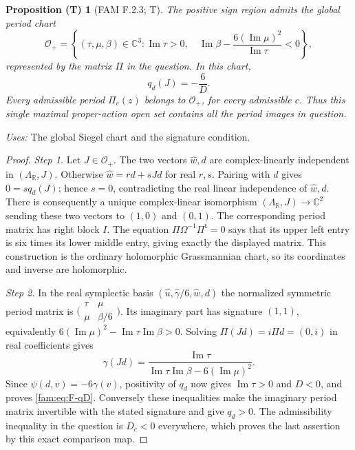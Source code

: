 \documentclass[11pt,a4paper]{article}
\theoremstyle{plain}
\newtheorem{proposition}[theorem]{Proposition (T)}
\theoremstyle{definition}
\begin{document}
\begin{proposition}[FAM F.2.3; T]\label{fam:F.2.3}
The positive sign region admits the global period chart
\[
 \mathcal O_+=\left\{
 (\tau,\mu,\beta)\in\mathbb C^3:
 \operatorname{Im}\tau>0,\quad
 \operatorname{Im}\beta-\frac{6(\operatorname{Im}\mu)^2}
 {\operatorname{Im}\tau}<0\right\},
\]
represented by the matrix $\Pi$ in the question.  In this chart,
\begin{equation}\label{fam:eq:F-qD}
 q_d(J)=-\frac6D.
\end{equation}
Every admissible period $\Pi_c(z)$ belongs to $\mathcal O_+$, for every
admissible $c$.  Thus this single maximal proper-action open set contains
all the period images in question.
\end{proposition}
\noindent\emph{Uses:} The global Siegel chart and the signature condition.\par

\begin{proof}
\par\noindent\textit{Step 1.} Let $J\in\mathcal O_+$.  The two vectors $\widehat w,d$ are complex-linearly
independent in $(\Lambda_{\mathbb R},J)$.  Otherwise
$\widehat w=r d+sJd$ for real $r,s$.  Pairing with $d$ gives
$0=sq_d(J)$; hence $s=0$, contradicting the real linear independence
of $\widehat w,d$.  There is consequently a unique complex-linear
isomorphism $(\Lambda_{\mathbb R},J)\to\mathbb C^2$ sending these two
vectors to $(1,0)$ and $(0,1)$.  The corresponding period matrix has
right block $I$.  The equation
$\Pi\Omega^{-1}\Pi^{\mathsf t}=0$ says that its upper left entry is
six times its lower middle entry, giving exactly the displayed matrix.
This construction is the ordinary holomorphic Grassmannian chart,
so its coordinates and inverse are holomorphic.

\par\noindent\textit{Step 2.} In the real symplectic basis
$(\widehat u,\widehat\gamma/6,\widehat w,d)$ the normalized symmetric
period matrix is
$\bigl(\begin{smallmatrix}\tau&\mu\\\mu&\beta/6\end{smallmatrix}\bigr)$.
Its imaginary part has signature $(1,1)$, equivalently
$6(\operatorname{Im}\mu)^2-
\operatorname{Im}\tau\operatorname{Im}\beta>0$.
Solving $\Pi(Jd)=i\Pi d=(0,i)$ in real coefficients gives
\[
 \gamma(Jd)=
 \frac{\operatorname{Im}\tau}
 {\operatorname{Im}\tau\operatorname{Im}\beta-
 6(\operatorname{Im}\mu)^2}.
\]
Since $\psi(d,v)=-6\gamma(v)$, positivity of $q_d$ now gives
$\operatorname{Im}\tau>0$ and $D<0$, and proves \eqref{fam:eq:F-qD}.
Conversely these inequalities make the imaginary period matrix
invertible with the stated signature and give $q_d>0$.  The admissibility
inequality in the question is $D_c<0$ everywhere, which proves the last
assertion by this exact comparison map.
\end{proof}
\end{document}
